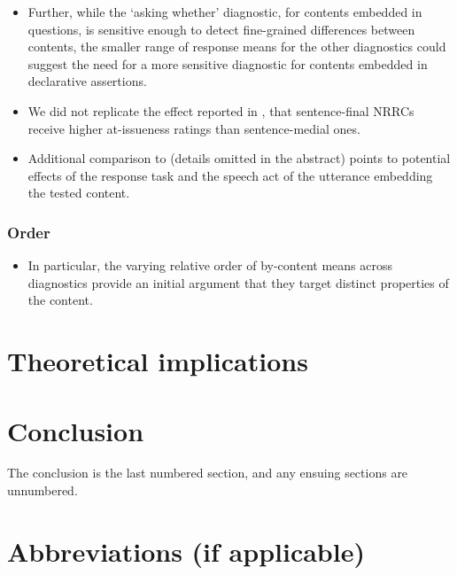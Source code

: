 \documentclass[times,linguex]{glossa}
\begin{document}
      \begin{itemize}
        \item Further, while the `asking whether' diagnostic, for contents embedded in questions, is sensitive enough to detect fine-grained differences between contents, the smaller range of response means for the other diagnostics could suggest the need for a more sensitive diagnostic for contents embedded in declarative assertions.

        \item We did not replicate the effect reported in \citealt{syrett_experimental_2015}, that sentence-final NRRCs receive higher at-issueness ratings than sentence-medial ones.

        \item  Additional comparison to \citealt{syrett_experimental_2015} (details omitted in the abstract) points to potential effects of the response task and the speech act of the utterance embedding the tested content.

      \end{itemize}

    \subsubsection{Order}

      \begin{itemize}
        \item In particular, the varying relative order of by-content means across diagnostics provide an initial argument that they target distinct properties of the content.
      \end{itemize}

\section{Theoretical implications}

\section{Conclusion}

The conclusion is the last numbered section, and any ensuing sections are unnumbered.

\pagebreak
\section*{Abbreviations (if applicable)}\label{abbrev}
\end{document}
